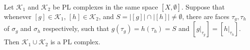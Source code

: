 Let $\mathcal{K}_1$ and $\mathcal{K}_2$ be PL complexes in the same space $[X, \emptyset]$. Suppose that whenever $[g] \in \mathcal{K}_1$, $[h] \in \mathcal{K}_2$, and $S = |[g]| \cap |[h]| \neq \emptyset$, there are faces $\tau_g, \tau_h$ of $\sigma_g$ and $\sigma_h$ respectively, such that $g(\tau_g) = h(\tau_h) = S$ and $[g|_{\tau_g}] = [h|_{\tau_h}]$. Then $\mathcal{K}_1 \cup \mathcal{K}_2$ is a PL complex.
